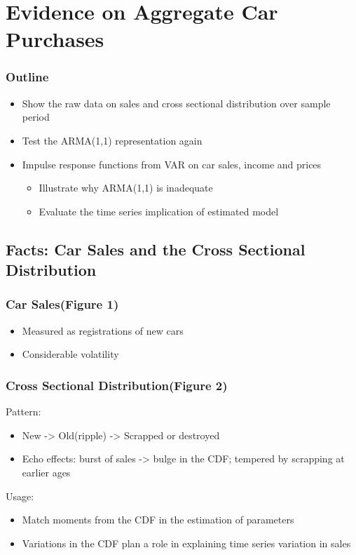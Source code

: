 \documentclass{beamer}
\begin{document}
\section{Evidence on Aggregate Car Purchases}
\begin{frame}
\frametitle{Outline}
\begin{itemize}
\item Show the raw data on sales and cross sectional distribution over sample period
\item Test the ARMA(1,1) representation again
\item Impulse response functions from VAR on car sales, income and prices
 \begin{itemize}
 \item Illustrate why ARMA(1,1) is inadequate
 \item Evaluate the time series implication of estimated model
 \end{itemize}
\end{itemize}
\end{frame}

\subsection{Facts: Car Sales and the Cross Sectional Distribution}

\begin{frame}
\frametitle{Car Sales(Figure 1)}
\begin{itemize}
\item Measured as registrations of new cars
\item Considerable volatility
\end{itemize}
\end{frame}

\begin{frame}
\frametitle{Cross Sectional Distribution(Figure 2)}
Pattern:
\begin{itemize}
\item New -> Old(ripple) -> Scrapped or destroyed
\item Echo effects: burst of sales -> bulge in the CDF; tempered by scrapping at earlier ages %
\end{itemize}
Usage:
\begin{itemize}
\item Match moments from the CDF in the estimation of parameters %
\item Variations in the CDF plan a role in explaining time series variation in sales
\end{itemize}
\end{frame}
\end{document}
